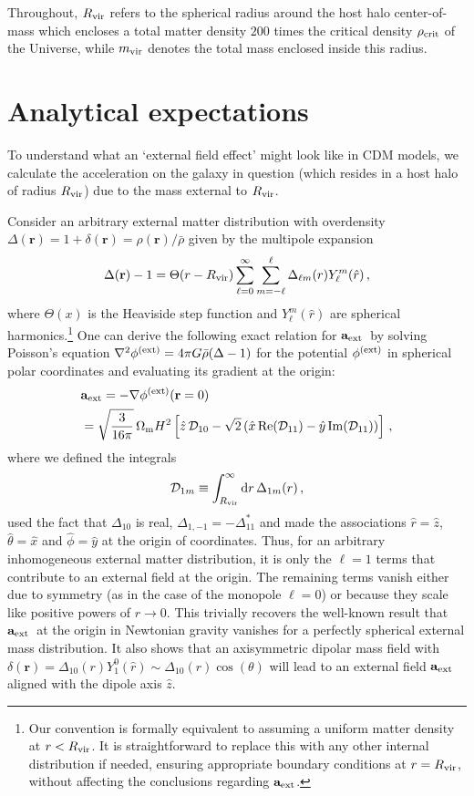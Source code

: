 \documentclass[usenatbib]{mnras}
\newcommand{\aext}{\ensuremath{\mathbf{a}_{\rm ext}}}
\newcommand{\der}{\ensuremath{{\rm d}}}
\newcommand{\be}{\begin{equation}}
\newcommand{\ee}{\end{equation}}
\newcommand{\Cal}[1]{\ensuremath{\mathcal{#1}}}
\begin{document}
Throughout, $R_{\rm vir}$ refers to the spherical radius around the host halo center-of-mass which encloses a total matter density $200$ times the critical density $\rho_{\rm crit}$ of the  Universe, while  $m_{\rm vir}$ denotes the total mass enclosed inside this radius.

\section{Analytical expectations}
\label{sec:analytical}
%
To understand what an `external field effect' might look like in CDM models, we calculate the acceleration on the galaxy in question (which resides in a host halo of radius $R_{\rm vir}$) due to the mass external to $R_{\rm vir}$.


Consider an arbitrary external matter distribution with overdensity $\Delta(\mathbf{r})=1+\delta(\mathbf{r})=\rho(\mathbf{r})/\bar\rho$ given by  the multipole expansion
\be
\Delta(\mathbf{r})-1 = \Theta(r-R_{\rm vir})\sum_{\ell=0}^\infty\sum_{m=-\ell}^\ell\Delta_{\ell m}(r)Y^m_\ell(\hat r)\,,
\ee
where $\Theta(x)$ is the Heaviside step function  and $Y^m_\ell(\hat r)$ are spherical harmonics.\footnote{Our convention is formally equivalent to assuming a uniform matter density at $r<R_{\rm vir}$. It is straightforward to replace this with any other internal distribution if needed, ensuring appropriate boundary conditions at $r=R_{\rm vir}$, without affecting the conclusions regarding \aext.} One can derive the following exact relation for \aext\ by solving Poisson's equation $\nabla^2\phi^{\rm (ext)}=4\pi G\bar\rho(\Delta-1)$ for the potential $\phi^{\rm (ext)}$ in spherical polar coordinates \citep[e.g.,][]{binney-tremaine-GalDyn} and evaluating its gradient at the origin:
\begin{align}
&\aext = -\nabla\phi^{\rm (ext)}(\mathbf{r}=0) \notag\\
&= \sqrt{\frac{3}{16\pi}}\,\Omega_{\rm m}H^2\left[\hat z\,\Cal{D}_{10} - \sqrt{2}\left(\hat x\,{\rm Re}(\Cal{D}_{11})-\hat y\,{\rm Im}(\Cal{D}_{11})\right)\right]\,,
\label{eq:aext-exact}
\end{align}
%
where we defined the integrals
\be
\Cal{D}_{1m}  \equiv \int_{R_{\rm vir}}^\infty\der r\,\Delta_{1m}(r)\,,
\label{eq:D1m-def}
\ee
%
used the fact that $\Delta_{10}$ is real, $\Delta_{1,-1} =  -\Delta_{11}^\ast$ and made the associations $\hat r=\hat z$, $\hat\theta=\hat x$ and $\hat\phi=\hat y$ at the origin of coordinates. Thus, for an arbitrary inhomogeneous external matter distribution, it is only the $\ell=1$ terms that contribute to an external field at the origin. The remaining terms vanish either due to symmetry (as in the case of the monopole $\ell=0$) or because they scale like positive powers of $r\to0$. This trivially recovers the well-known result that \aext\ at the origin in Newtonian gravity vanishes for a perfectly spherical external mass distribution. It also shows that an axisymmetric dipolar mass field with $\delta(\mathbf{r})=\Delta_{10}(r)Y^0_1(\hat r)\sim\Delta_{10}(r)\cos(\theta)$ will lead to an external field $\aext$ aligned with the dipole axis $\hat  z$. 
\end{document}
